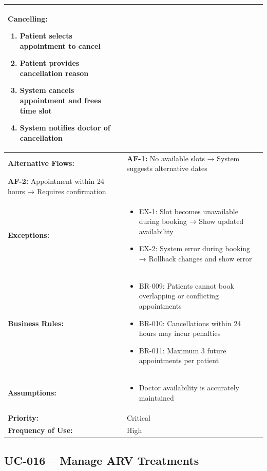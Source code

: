 \documentclass[12pt,a4paper]{article}
\begin{document}
\begin{longtable}{|p{4.5cm}|p{10.5cm}|}
\begin{enumerate}
\end{enumerate}
\textbf{Cancelling:}
\begin{enumerate}
  \item Patient selects appointment to cancel
  \item Patient provides cancellation reason
  \item System cancels appointment and frees time slot
  \item System notifies doctor of cancellation
\end{enumerate} \\
\hline
\textbf{Alternative Flows:} &
\textbf{AF-1:} No available slots → System suggests alternative dates \\
\textbf{AF-2:} Appointment within 24 hours → Requires confirmation \\
\hline
\textbf{Exceptions:} &
\begin{itemize}
  \item EX-1: Slot becomes unavailable during booking → Show updated availability
  \item EX-2: System error during booking → Rollback changes and show error
\end{itemize} \\
\hline
\textbf{Business Rules:} &
\begin{itemize}
  \item BR-009: Patients cannot book overlapping or conflicting appointments
  \item BR-010: Cancellations within 24 hours may incur penalties
  \item BR-011: Maximum 3 future appointments per patient
\end{itemize} \\
\hline
\textbf{Assumptions:} &
\begin{itemize}
  \item Doctor availability is accurately maintained
\end{itemize} \\
\hline
\textbf{Priority:} & Critical \\
\hline
\textbf{Frequency of Use:} & High \\
\hline
\end{longtable}

\subsection{UC-016 – Manage ARV Treatments}
\end{document}
